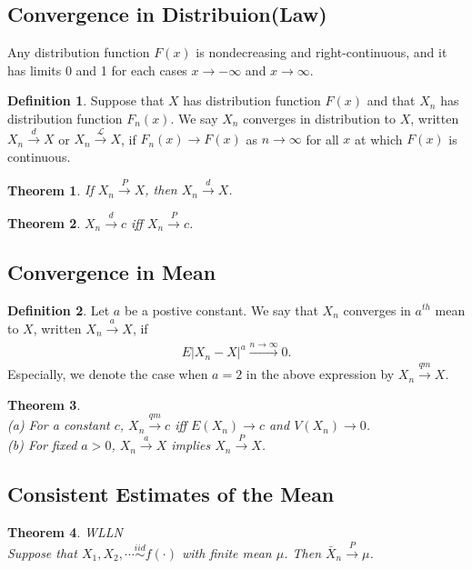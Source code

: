 \documentclass[12pt]{article}
\renewcommand{\=}[1]{\stackrel{#1}{=}} %
\newtheorem{thm}{Theorem}[section]
\theoremstyle{definition}
\newtheorem*{dfn}{Definition}
\begin{document}
	\subsection{Convergence in Distribuion(Law)}
		Any distribution function $F(x)$ is nondecreasing and right-continuous, and it has limits 0 and 1 for each cases $x\rightarrow-\infty$ and $x\rightarrow\infty$. 
		\begin{dfn}
			Suppose that $X$ has distribution function $F(x)$ and that $X_n$ has distribution function $F_n(x)$. We say $X_n$ converges in distribution to $X$, written $X_n\overset{d}{\rightarrow}X$ or $X_n\overset{\mathcal{L}}{\rightarrow}X$, if $F_n(x)\overset{}{\rightarrow}F(x)$ as $n\overset{}{\rightarrow}\infty$ for all $x$ at which $F(x)$ is continuous.
		\end{dfn}
	\begin{thm}
		If $X_n\overset{P}{\rightarrow}X$, then $X_n\overset{d}{\rightarrow}X$.
	\end{thm}
	\begin{thm}
	$X_n\overset{d}{\rightarrow}c$ iff $X_n\overset{P}{\rightarrow}c$.
	\end{thm}
	\subsection{Convergence in Mean}
		\begin{dfn}
			Let $a$ be a postive constant. We say that $X_n$ converges in $a^{th}$ mean to $X$, written $X_n\overset{a}{\rightarrow}X$, if
			\begin{align}
			E|X_n-X|^a\overset{n\overset{}{\rightarrow}\infty}{\rightarrow}0.
			\end{align}
			Especially, we denote the case when $a=2$ in the above expression by $X_n\overset{qm}{\rightarrow}X$.
		\end{dfn}
	\begin{thm}
		~\\(a) For a constant $c$, $X_n\overset{qm}{\rightarrow}c$ iff $E(X_n)\overset{}{\rightarrow}c$ and $V(X_n)\overset{}{\rightarrow}0$.\\
		(b) For fixed $a>0$, $X_n\overset{a}{\rightarrow}X$ implies $X_n\overset{P}{\rightarrow}X$.
	\end{thm}
\subsection{Consistent Estimates of the Mean}
\begin{thm}
	WLLN\\Suppose that $X_1,X_2,\cdots\overset{iid}{\sim}f(\cdot)$ with finite mean $\mu$. Then $\bar{X}_n\overset{P}{\rightarrow}\mu$.
\end{thm}
\end{document}
